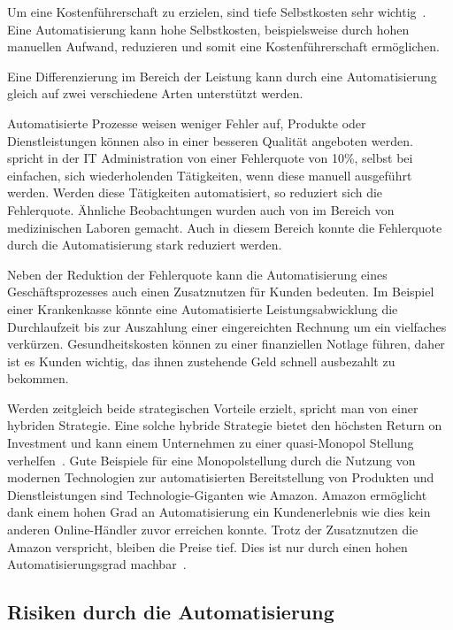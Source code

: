 Um eine Kostenführerschaft zu erzielen, sind tiefe Selbstkosten sehr wichtig~\autocite{Capaul2010}. Eine Automatisierung kann hohe Selbstkosten, beispielsweise durch hohen manuellen Aufwand, reduzieren und somit eine Kostenführerschaft ermöglichen.

Eine Differenzierung im Bereich der Leistung kann durch eine Automatisierung gleich auf zwei verschiedene Arten unterstützt werden. 

Automatisierte Prozesse weisen weniger Fehler auf, Produkte oder Dienstleistungen können also in einer besseren Qualität angeboten werden. \textcite{Kregassner2012} spricht in der IT Administration von einer Fehlerquote von 10\%, selbst bei einfachen, sich wiederholenden Tätigkeiten, wenn diese manuell ausgeführt werden. Werden diese Tätigkeiten automatisiert, so reduziert sich die Fehlerquote. Ähnliche Beobachtungen wurden auch von \textcite{Uettwiller-Geiger2005} im Bereich von medizinischen Laboren gemacht. Auch in diesem Bereich konnte die Fehlerquote durch die Automatisierung stark reduziert werden. 

Neben der Reduktion der Fehlerquote kann die Automatisierung eines Geschäftsprozesses auch einen Zusatznutzen für Kunden bedeuten. Im Beispiel einer Krankenkasse könnte eine Automatisierte Leistungsabwicklung die Durchlaufzeit bis zur Auszahlung einer eingereichten Rechnung um ein vielfaches verkürzen. Gesundheitskosten können zu einer finanziellen Notlage führen, daher ist es Kunden wichtig, das ihnen zustehende Geld schnell ausbezahlt zu bekommen. 

Werden zeitgleich beide strategischen Vorteile erzielt, spricht man von einer hybriden Strategie. Eine solche hybride Strategie bietet den höchsten Return on Investment und kann einem Unternehmen zu einer quasi-Monopol Stellung verhelfen~\autocite{Lombriser2010}. Gute Beispiele für eine Monopolstellung durch die Nutzung von modernen Technologien zur automatisierten Bereitstellung von Produkten und Dienstleistungen sind Technologie-Giganten wie Amazon. Amazon ermöglicht dank einem hohen Grad an Automatisierung ein Kundenerlebnis wie dies kein anderen Online-Händler zuvor erreichen konnte. Trotz der Zusatznutzen die Amazon verspricht, bleiben die Preise tief. Dies ist nur durch einen hohen Automatisierungsgrad machbar~\autocite{Kha2000}.

\subsection{Risiken durch die Automatisierung}

